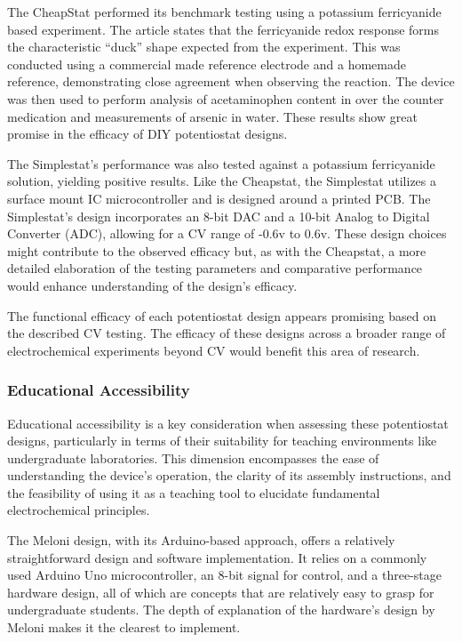 \documentclass{article}
\begin{document}
The CheapStat performed its benchmark testing using a potassium ferricyanide based experiment. The article states that the ferricyanide redox response forms the characteristic ``duck'' shape expected from the experiment. This was conducted using a commercial made reference electrode and a homemade reference, demonstrating close agreement when observing the reaction. The device was then used to perform analysis of acetaminophen content in over the counter medication and measurements of arsenic in water. These results show great promise in the efficacy of DIY potentiostat designs.


The Simplestat's performance was also tested against a potassium ferricyanide solution, yielding positive results. Like the Cheapstat, the Simplestat utilizes a surface mount IC microcontroller and is designed around a printed PCB. The Simplestat's design incorporates an 8-bit DAC and a 10-bit Analog to Digital Converter (ADC), allowing for a CV range of -0.6v to 0.6v. These design choices might contribute to the observed efficacy but, as with the Cheapstat, a more detailed elaboration of the testing parameters and comparative performance would enhance understanding of the design's efficacy.


The functional efficacy of each potentiostat design appears promising based on the described CV testing. The efficacy of these designs across a broader range of electrochemical experiments beyond CV would benefit this area of research.


\subsubsection*{Educational Accessibility}
Educational accessibility is a key consideration when assessing these potentiostat designs, particularly in terms of their suitability for teaching environments like undergraduate laboratories. This dimension encompasses the ease of understanding the device's operation, the clarity of its assembly instructions, and the feasibility of using it as a teaching tool to elucidate fundamental electrochemical principles.


The Meloni design, with its Arduino-based approach, offers a relatively straightforward design and software implementation. It relies on a commonly used Arduino Uno microcontroller, an 8-bit signal for control, and a three-stage hardware design, all of which are concepts that are relatively easy to grasp for undergraduate students. The depth of explanation of the hardware's design by Meloni makes it the clearest to implement.
\end{document}
